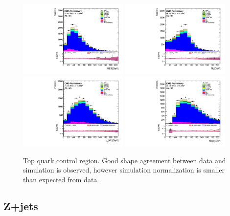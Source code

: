 \begin{figure}[htbp]
	\centering
		\includegraphics[width=0.48\textwidth]{Figures/Results/TT_GetMET_doQCD1.pdf}
		\includegraphics[width=0.48\textwidth]{Figures/Results/TT_GetVMt_doQCD1.pdf}
		\includegraphics[width=0.48\textwidth]{Figures/Results/TT_GetWpt_doQCD1.pdf}
		\includegraphics[width=0.48\textwidth]{Figures/Results/TT_H_mass_doQCD1.pdf}		
	\caption[Top quark control region]{Top quark control region. Good shape agreement between data and simulation is observed, however simulation normalization is smaller than expected from data.}
	\label{fig:TT_CR}
\end{figure}

\subsection{Z+jets}

